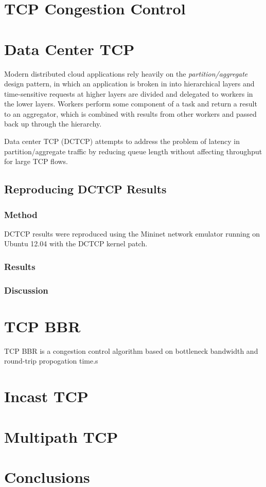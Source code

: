 \section{TCP Congestion Control}


\section{Data Center TCP}

Modern distributed cloud applications rely heavily on the \emph{partition/aggregate} design pattern, in which an application is broken in into hierarchical layers and time-sensitive requests at higher layers are divided and delegated to workers in the lower layers. Workers perform some component of a task and return a result to an aggregator, which is combined with results from other workers and passed back up through the hierarchy. 

Data center TCP (DCTCP) attempts to address the problem of latency in partition/aggregate traffic by reducing queue length without affecting throughput for large TCP flows.

\subsection{Reproducing DCTCP Results}

\subsubsection{Method}

DCTCP results were reproduced using the Mininet network emulator running on Ubuntu 12.04 with the DCTCP kernel patch.

\subsubsection{Results}

\subsubsection{Discussion}

\section{TCP BBR}

TCP BBR is a congestion control algorithm based on bottleneck bandwidth and round-trip propogation time.s

\section{Incast TCP}

\section{Multipath TCP}

\section{Conclusions}

